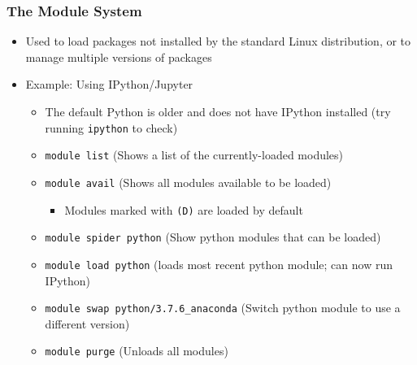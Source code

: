 \documentclass[hyperref,pdfa,unicode,utf8,usepdftitle]{beamer}
\begin{document}
\begin{frame}
  \frametitle{The Module System}
  \begin{itemize}
  \item Used to load packages not installed by the standard Linux
    distribution, or to manage multiple versions of packages
  \item Example: Using IPython/Jupyter
    \begin{itemize}
    \item The default Python is older and does not have IPython
      installed (try running \lstinline{ipython} to check)
    \item \lstinline{module list} (Shows a list of the currently-loaded modules)
    \item \lstinline{module avail} (Shows all modules available to be loaded)
      \begin{itemize}
      \item Modules marked with \lstinline{(D)} are loaded by default
      \end{itemize}
    \item \lstinline{module spider python} (Show python modules that
      can be loaded)
    \item \lstinline{module load python} (loads most recent python
      module; can now run IPython)
    \item \lstinline{module swap python/3.7.6_anaconda} (Switch python
      module to use a different version)
    \item \lstinline{module purge} (Unloads all modules)
    \end{itemize}
  \end{itemize}
\end{frame}
\end{document}

